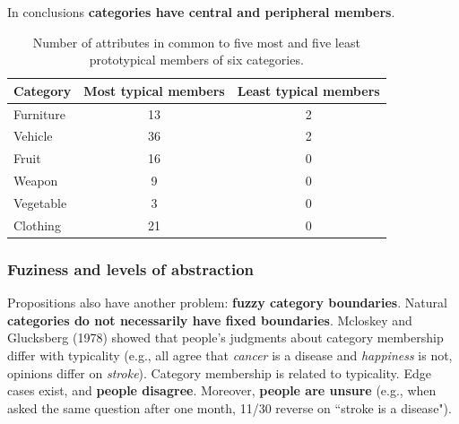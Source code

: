 In conclusions \textbf{categories have central and peripheral members}.


\begin{table}[h]
    \centering
    \captionsetup{width=.8\linewidth}
    \begin{tabular}{lcc}
        \hline
        Category & Most typical members & Least typical members \\
        \hline
        Furniture & 13 & 2 \\
        Vehicle & 36 & 2 \\
        Fruit & 16 & 0 \\
        Weapon & 9 & 0 \\
        Vegetable & 3 & 0 \\
        Clothing & 21 & 0 \\
        \hline
    \end{tabular}
    \caption{Number of attributes in common to five most and five least prototypical members of six categories.}
    \label{tab:rosch}
\end{table}

\subsubsection{Fuziness and levels of abstraction}
Propositions also have another problem: \textbf{fuzzy category boundaries}. Natural \textbf{categories do not necessarily have fixed boundaries}.
Mcloskey and Glucksberg (1978) showed that people's judgments about category membership differ with typicality (e.g., all agree that \textit{cancer} is a disease and \textit{happiness} is not, opinions differ on \textit{stroke}). Category membership is related to typicality. Edge cases exist, and \textbf{people disagree}. Moreover, \textbf{people are unsure} (e.g., when asked the same question after one month, 11/30 reverse on ``stroke is a disease").\\

